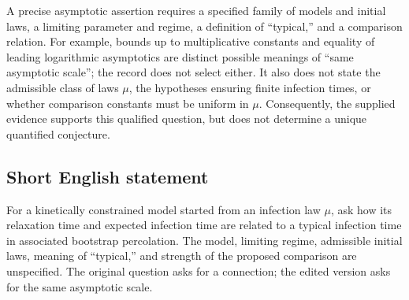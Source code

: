 \documentclass[11pt]{article}
\begin{document}
A precise asymptotic assertion requires a specified family of models and initial laws, a limiting parameter and regime, a definition of ``typical,'' and a comparison relation. For example, bounds up to multiplicative constants and equality of leading logarithmic asymptotics are distinct possible meanings of ``same asymptotic scale''; the record does not select either. It also does not state the admissible class of laws \(\mu\), the hypotheses ensuring finite infection times, or whether comparison constants must be uniform in \(\mu\). Consequently, the supplied evidence supports this qualified question, but does not determine a unique quantified conjecture.
\subsection{Short English statement}
For a kinetically constrained model started from an infection law \(\mu\), ask how its relaxation time and expected infection time are related to a typical infection time in associated bootstrap percolation. The model, limiting regime, admissible initial laws, meaning of ``typical,'' and strength of the proposed comparison are unspecified. The original question asks for a connection; the edited version asks for the same asymptotic scale.
\end{document}

